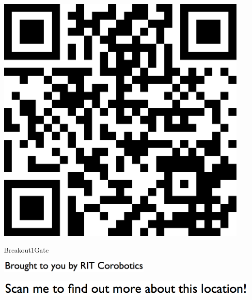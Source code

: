 \documentclass[letterpaper]{article}
\begin{document}
 \begingroup 
 \centerline{\includegraphics[scale=1,width=5in,height=5in]{Breakout1Gate.png}} 
 \endgroup 
 \vspace*{\fill} 

 \hfill{\small Breakout1Gate} 

  \vspace{0.7in} 
 
 \centerline{\includegraphics[scale=1,width=3in]{text-bottom.png}} 
 
 \pagebreak 
{} 
 \vspace*{\fill} 
 
  \centerline{\includegraphics[scale=1,width=6in]{text-top.png}} 
 
 \vspace{0.5in} 
 
\end{document}
